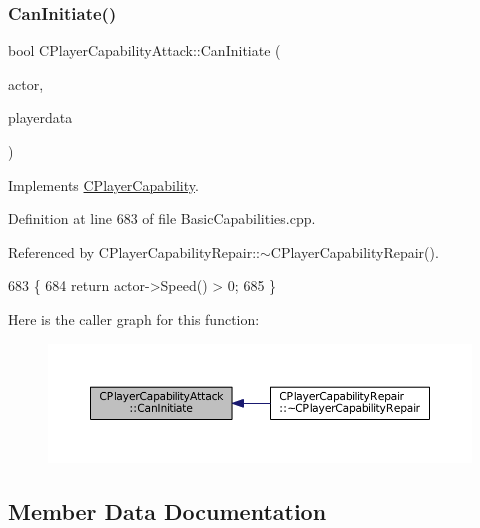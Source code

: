 \subsubsection{\texorpdfstring{Can\+Initiate()}{CanInitiate()}}
{\footnotesize\ttfamily bool C\+Player\+Capability\+Attack\+::\+Can\+Initiate (\begin{DoxyParamCaption}\item[{std\+::shared\+\_\+ptr$<$ \hyperlink{classCPlayerAsset}{C\+Player\+Asset} $>$}]{actor,  }\item[{std\+::shared\+\_\+ptr$<$ \hyperlink{classCPlayerData}{C\+Player\+Data} $>$}]{playerdata }\end{DoxyParamCaption})\hspace{0.3cm}{\ttfamily [virtual]}}



Implements \hyperlink{classCPlayerCapability_aa83b1e1fcaff2985c378132d679154ea}{C\+Player\+Capability}.



Definition at line 683 of file Basic\+Capabilities.\+cpp.



Referenced by C\+Player\+Capability\+Repair\+::$\sim$\+C\+Player\+Capability\+Repair().


\begin{DoxyCode}
683                                                                                                            
                \{
684     \textcolor{keywordflow}{return} actor->Speed() > 0;
685 \}
\end{DoxyCode}
Here is the caller graph for this function\+:\nopagebreak
\begin{figure}[H]
\begin{center}
\leavevmode
\includegraphics[width=350pt]{classCPlayerCapabilityAttack_ab1cda67a8e637a90accf03d1581d4072_icgraph}
\end{center}
\end{figure}


\subsection{Member Data Documentation}
\hypertarget{classCPlayerCapabilityAttack_a22b5c69229cdc25c3f289de947db148d}{}\label{classCPlayerCapabilityAttack_a22b5c69229cdc25c3f289de947db148d} 
